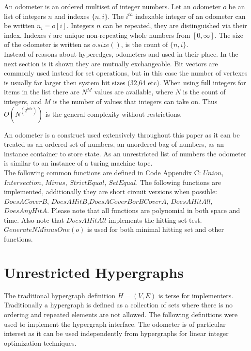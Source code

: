 An odometer is an ordered multiset of integer numbers. Let an odometer $o$ be an list of integers $n$ and indexes $\{n,i\}$. The $i^{th}$ indexable integer of an odometer can be written $n_i = o[i]$. Integers $n$ can be repeated, they are distinguished via their index. Indexes $i$ are unique non-repeating whole numbers from $[0,\infty]$. The size of the odometer is written as $o.size()$, is the count of $\{n,i\}$. \\

Instead of reasons about hyperedges, odometers and used in their place. In the next section is it shown they are mutually exchangeable. Bit vectors are commonly used instead for set operations, but in this case the number of vertexes is usually far larger then system bit sizes (32,64 etc). When using full integers for items in the list there are $N^M$ values are available, where $N$ is the count of integers, and $M$ is the number of values that integers can take on. Thus $O(N^{(2^{bits})})$ is the general complexity without restrictions. \cite{Odometer:Fuchs}

An odometer is a construct used extensively throughout this paper as it can be treated as an ordered set of numbers, an unordered bag of numbers, as an instance container to store state. As an unrestricted list of numbers the odometer is similar to an instance of a turing machine tape. \\

The following common functions are defined in Code Appendix C: $Union$, $Intersection$, $Minus$, $StrictEqual$, $SetEqual$. The following functions are implemented, additionally they are short circuit versions when possible: $DoesACoverB$, $DoesAHitB$,$DoesACoverBorBCoverA$, $DoesAHitAll$, $DoesAnyHitA$. Please note that all functions are polynomial in both space and time. Also note that $DoesAHitAll$ implements the hitting set test. $GenerateNMinusOne(o)$ is used for both minimal hitting set and other functions.\\

\section{Unrestricted Hypergraphs}
The traditional hypergraph definition $H=(V,E)$ is terse for implementers. Traditionally a hypergraph is defined as a collection of sets where there is no ordering and repeated elements are not allowed. The following definitions were used  to implement the hypergraph interface. The odometer is of particular interest as it can be used independently from hypergraphs for linear integer optimization techniques.\\

